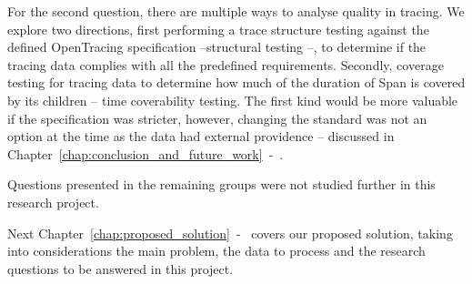 For the second question, there are multiple ways to analyse quality in tracing. We explore two directions, first performing a trace structure testing against the defined OpenTracing specification --structural testing --, to determine if the tracing data complies with all the predefined requirements. Secondly, coverage testing for tracing data to determine how much of the duration of Span is covered by its children -- time coverability testing. The first kind would be more valuable if the specification was stricter, however, changing the standard was not an option at the time as the data had external providence -- discussed in Chapter~\ref{chap:conclusion_and_future_work}~-~.

Questions presented in the remaining groups were not studied further in this research project.

Next Chapter~\ref{chap:proposed_solution}~-~ covers our proposed solution, taking into considerations the main problem, the data to process and the research questions to be answered in this project.

\checkoddpage
{}
{ %
    \newpage
    \blankpage}
{ %
}
